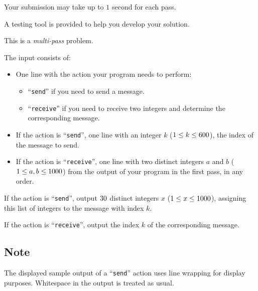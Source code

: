 Your submission may take up to $1$ second for each pass.

A testing tool is provided to help you develop your solution.

\pagebreak

\begin{Input}
    This is a \emph{multi-pass} problem.

    The input consists of:
    \begin{itemize}
        \item One line with the action your program needs to perform:
            \begin{itemize}
                \item ``\texttt{send}'' if you need to send a message.
                \item ``\texttt{receive}'' if you need to receive two integers and determine the corresponding message.
            \end{itemize}
        \item If the action is ``\texttt{send}'', one line with an integer $k$ ($1 \leq k \leq 600$), the index of the message to send.
        \item If the action is ``\texttt{receive}'', one line with two distinct integers $a$ and $b$ ($1 \leq a, b \leq 1000$)
            from the output of your program in the first pass, in any order.
    \end{itemize}
\end{Input}

\begin{Output}
    If the action is ``\texttt{send}'', output $30$ distinct integers $x$ ($1\leq x\leq 1000$), assigning this list of integers to the message with index $k$.

    If the action is ``\texttt{receive}'', output the index $k$ of the corresponding message.
\end{Output}

\subsection*{Note}
    The displayed sample output of a ``\texttt{send}'' action uses line wrapping for display purposes.
    Whitespace in the output is treated as usual.
